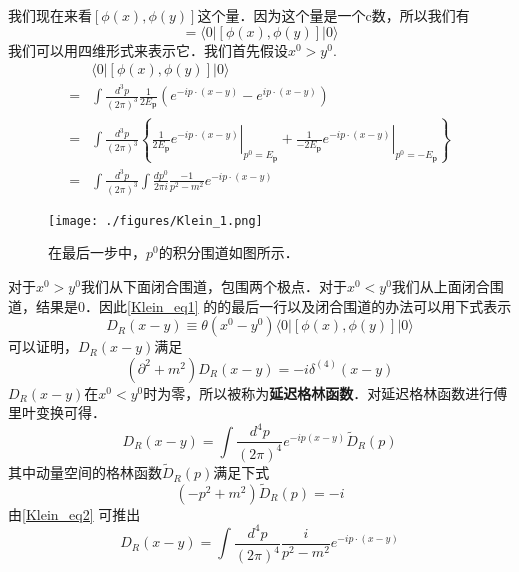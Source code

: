 
我们现在来看$[\phi(x),\phi(y)]$这个量．因为这个量是一个c数，所以我们有
\begin{equation}
[\phi(x),\phi(y)] = \langle 0 | [\phi(x),\phi(y)] | 0 \rangle
\end{equation}
我们可以用四维形式来表示它．我们首先假设$x^0>y^0$.
\begin{equation}\label{Klein_eq1}
\begin{aligned}
& \langle 0|[\phi(x), \phi(y)]| 0\rangle\\
=&\int \frac{d^{3} p}{(2 \pi)^{3}} \frac{1}{2 E_{\mathbf{p}}}\left(e^{-i p \cdot(x-y)}-e^{i p \cdot(x-y)}\right) \\ 
=& \int \frac{d^{3} p}{(2 \pi)^{3}}\left\{\left.\frac{1}{2 E_{\mathbf{p}}} e^{-i p \cdot(x-y)}\right|_{p^{0}=E_{\mathbf{p}}}+\left.\frac{1}{-2 E_{\mathbf{p}}} e^{-i p \cdot(x-y)}\right|_{p^{0}=-E_{\mathbf{p}}}\right\} \\
=& \int \frac{d^{3} p}{(2 \pi)^{3}} \int \frac{d p^{0}}{2 \pi i} \frac{-1}{p^{2}-m^{2}} e^{-i p \cdot(x-y)} 
\end{aligned}
\end{equation}
\begin{figure}[ht]
\centering
\texttt{[image: ./figures/Klein\_1.png]}
\caption{在最后一步中，$p^0$的积分围道如图所示．} \label{Klein_fig1}
\end{figure}
对于$x^0>y^0$我们从下面闭合围道，包围两个极点．对于$x^0<y^0$我们从上面闭合围道，结果是0．因此\autoref{Klein_eq1} 的的最后一行以及闭合围道的办法可以用下式表示
\begin{equation}
D_R(x-y)\equiv \theta(x^0-y^0)\langle 0 | [\phi(x),\phi(y)]|0 \rangle
\end{equation}
可以证明，$D_R(x-y)$满足
\begin{equation}
(\partial^2+m^2)D_R(x-y) = -i \delta^{(4)}(x-y)
\end{equation}
$D_R(x-y)$在$x^0<y^0$时为零，所以被称为\textbf{延迟格林函数}．对延迟格林函数进行傅里叶变换可得．
\begin{equation}
D_R(x-y) = \int \frac{d^4p}{(2\pi)^4} e^{-ip(x-y)} \tilde D_R (p)
\end{equation}
其中动量空间的格林函数$\tilde D_R(p)$满足下式
\begin{equation}\label{Klein_eq2}
(-p^2+m^2) \tilde D_R(p) = -i
\end{equation}
由\autoref{Klein_eq2} 可推出
\begin{equation}
D_R (x-y) = \int \frac{d^4p}{(2\pi)^4} \frac{i}{p^2-m^2} e^{-ip\cdot(x-y)}
\end{equation}

